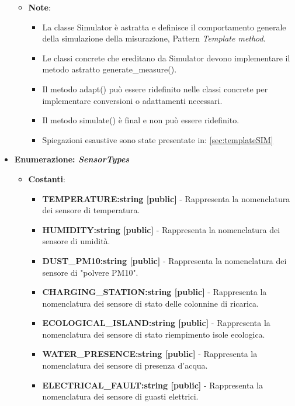 \begin{itemize}
\begin{itemize}
\begin{itemize}
            \end{itemize}
            \item \textbf{Note}:
            \begin{itemize}
                \item La classe Simulator è astratta e definisce il comportamento generale della simulazione della misurazione, Pattern \textit{Template method}.
                \item Le classi concrete che ereditano da Simulator devono implementare il metodo astratto generate\_measure().
                \item Il metodo adapt() può essere ridefinito nelle classi concrete per implementare conversioni o adattamenti necessari.
                \item Il metodo simulate() è final e non può essere ridefinito.
                \item Spiegazioni esaustive sono state presentate in: \ref{sec:templateSIM}
            \end{itemize}
        \end{itemize}
        
        
        
        
        \item{\textbf{Enumerazione: \textit{SensorTypes}}}
        \begin{itemize}
            \item \textbf{Costanti}: 
            \begin{itemize}
                \item \textbf{TEMPERATURE:string [public]} - Rappresenta la nomenclatura dei sensore di temperatura.
                \item \textbf{HUMIDITY:string [public]} - Rappresenta la nomenclatura dei sensore di umidità.
                \item \textbf{DUST\_PM10:string [public]} - Rappresenta la nomenclatura dei sensore di "polvere PM10".
                \item \textbf{CHARGING\_STATION:string [public]} - Rappresenta la nomenclatura dei sensore di stato delle colonnine di ricarica.
                \item \textbf{ECOLOGICAL\_ISLAND:string [public]} - Rappresenta la nomenclatura dei sensore di stato riempimento isole ecologica.
                \item \textbf{WATER\_PRESENCE:string [public]} - Rappresenta la nomenclatura dei sensore di presenza d'acqua.
                \item \textbf{ELECTRICAL\_FAULT:string [public]} - Rappresenta la nomenclatura dei sensore di guasti elettrici.
            \end{itemize}


\end{itemize}
\end{itemize}
